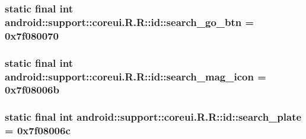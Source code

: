\hypertarget{classandroid_1_1support_1_1coreui_1_1_r_1_1id_927da6fcf7daeef47c6d3191b431585c}{
\subsubsection[{search\_\-go\_\-btn}]{\setlength{\rightskip}{0pt plus 5cm}static final int android::support::coreui.R.R::id::search\_\-go\_\-btn = 0x7f080070}}
\label{classandroid_1_1support_1_1coreui_1_1_r_1_1id_927da6fcf7daeef47c6d3191b431585c}


\hypertarget{classandroid_1_1support_1_1coreui_1_1_r_1_1id_8c866d0696876001fd80ba037c8bcee6}{
\subsubsection[{search\_\-mag\_\-icon}]{\setlength{\rightskip}{0pt plus 5cm}static final int android::support::coreui.R.R::id::search\_\-mag\_\-icon = 0x7f08006b}}
\label{classandroid_1_1support_1_1coreui_1_1_r_1_1id_8c866d0696876001fd80ba037c8bcee6}


\hypertarget{classandroid_1_1support_1_1coreui_1_1_r_1_1id_c8dc1aa811441cb73ba436df96471a6a}{
\subsubsection[{search\_\-plate}]{\setlength{\rightskip}{0pt plus 5cm}static final int android::support::coreui.R.R::id::search\_\-plate = 0x7f08006c}}
\label{classandroid_1_1support_1_1coreui_1_1_r_1_1id_c8dc1aa811441cb73ba436df96471a6a}


